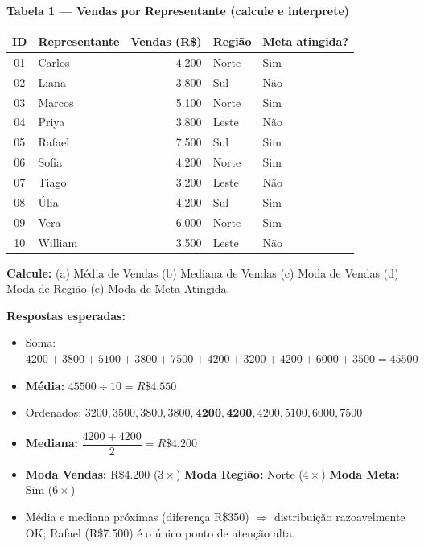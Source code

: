 \begin{BoardBox}
\textbf{Tabela 1 — Vendas por Representante (calcule e interprete)}

\medskip
\begin{tabular}{|c|l|r|l|l|}
\hline
\textbf{ID} & \textbf{Representante} & \textbf{Vendas (R\$)} & \textbf{Região} & \textbf{Meta atingida?} \\
\hline
01 & Carlos  & 4.200 & Norte & Sim \\
02 & Liana   & 3.800 & Sul   & Não \\
03 & Marcos  & 5.100 & Norte & Sim \\
04 & Priya   & 3.800 & Leste & Não \\
05 & Rafael  & 7.500 & Sul   & Sim \\
06 & Sofia   & 4.200 & Norte & Sim \\
07 & Tiago   & 3.200 & Leste & Não \\
08 & Úlia    & 4.200 & Sul   & Sim \\
09 & Vera    & 6.000 & Norte & Sim \\
10 & William & 3.500 & Leste & Não \\
\hline
\end{tabular}

\smallskip
\textbf{Calcule:} (a) Média de Vendas \quad (b) Mediana de Vendas \quad
(c) Moda de Vendas \quad (d) Moda de Região \quad (e) Moda de Meta Atingida.

\smallskip
\textbf{Respostas esperadas:}
\begin{itemize}
  \item Soma: $4200+3800+5100+3800+7500+4200+3200+4200+6000+3500 = 45500$
  \item \textbf{Média:} $45500 \div 10 = R\$4.550$
  \item Ordenados: $3200, 3500, 3800, 3800, \mathbf{4200, 4200}, 4200, 5100, 6000, 7500$
  \item \textbf{Mediana:} $\dfrac{4200+4200}{2} = R\$4.200$
  \item \textbf{Moda Vendas:} R\$4.200 ($3\times$) \quad
    \textbf{Moda Região:} Norte ($4\times$) \quad
    \textbf{Moda Meta:} Sim ($6\times$)
  \item Média e mediana próximas (diferença R\$350) $\Rightarrow$ distribuição
  razoavelmente OK; Rafael (R\$7.500) é o único ponto de atenção alta.
\end{itemize}
\end{BoardBox}

